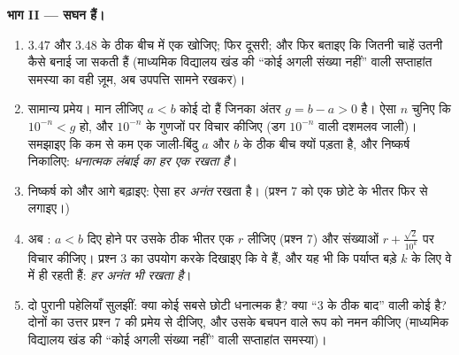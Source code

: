 \begin{problem}
\medskip
\noindent\textbf{भाग II ---  सघन हैं।}
\begin{enumerate}[resume]
  \item $3.47$ और $3.48$ के ठीक बीच में एक  खोजिए; फिर दूसरी;
        और फिर बताइए कि जितनी चाहें उतनी कैसे बनाई जा सकती हैं (माध्यमिक
        विद्यालय खंड की ``कोई अगली संख्या नहीं'' वाली सप्ताहांत समस्या का
        वही ज़ूम, अब उपपत्ति सामने रखकर)।
  \item सामान्य प्रमेय। मान लीजिए $a < b$ कोई दो  हैं
        जिनका अंतर $g = b - a > 0$ है। ऐसा $n$ चुनिए कि $10^{-n} < g$ हो, और $10^{-n}$ के
        गुणजों पर विचार कीजिए (डग $10^{-n}$ वाली दशमलव जाली)। समझाइए कि
        कम से कम एक जाली-बिंदु $a$ और $b$ के ठीक बीच क्यों पड़ता है,
        और निष्कर्ष निकालिए: \emph{धनात्मक लंबाई का हर  एक  रखता है}।
  \item निष्कर्ष को और आगे बढ़ाइए: ऐसा हर  \emph{अनंत}  रखता है। (प्रश्न 7 को एक छोटे  के भीतर फिर से
        लगाइए।)
  \item अब : $a < b$ दिए होने पर उसके ठीक भीतर एक  $r$ लीजिए (प्रश्न 7) और संख्याओं $r + \frac{\sqrt2}{10^k}$ पर विचार कीजिए।
        प्रश्न 3 का उपयोग करके दिखाइए कि वे  हैं, और यह भी कि
        पर्याप्त बड़े $k$ के लिए वे  में ही रहती हैं:
        \emph{हर  अनंत  भी रखता है}।
  \item दो पुरानी पहेलियाँ सुलझीं: क्या कोई सबसे छोटी धनात्मक  है? क्या ``$3$ के ठीक बाद'' वाली कोई  है?
        दोनों का उत्तर प्रश्न 7 की प्रमेय से दीजिए, और उसके बचपन वाले रूप
        को नमन कीजिए (माध्यमिक विद्यालय खंड की ``कोई अगली संख्या नहीं''
        वाली सप्ताहांत समस्या)।
\end{enumerate}


\end{problem}
